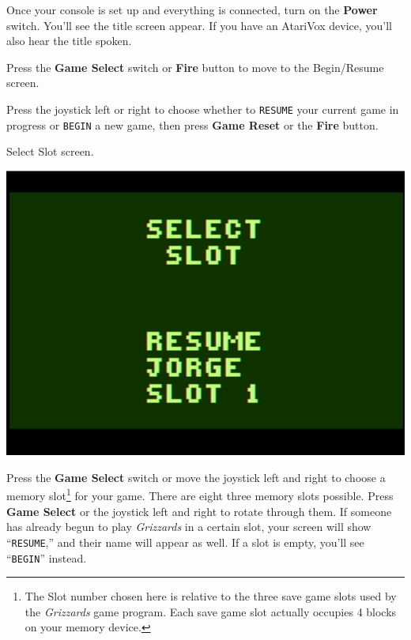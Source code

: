 \documentclass[10pt,twocolumn,openany,article]{memoir}
\begin{document}
Once your  console is set  up and everything  is connected, turn  on the
\textbf{Power} switch. You'll  see the title screen appear.  If you have
an AtariVox device, you'll also hear the title spoken.

Press the \textbf{Game Select} switch or \textbf{Fire} button to move to
the
\ifdefined\NOSAVE
Begin/Resume screen.

Press the  joystick left or  right to choose whether  to \texttt{RESUME}
your current game  in progress or \texttt{BEGIN} a new  game, then press
\textbf{Game Reset} or the \textbf{Fire} button.

\else
Select Slot screen.

\begin{center}
  \includegraphics[width=\columnwidth]{../Manual/SelectSlotNTSC.png}
\end{center}

Press  the \textbf{Game  Select} switch  or move  the joystick  left and
right to  choose a  memory slot\ifdefined\ATARIAGESAVE\else\footnote{The
  Slot number chosen here is relative  to the three save game slots used
  by the \textit{Grizzards}  game program. Each save  game slot actually
  occupies  4  blocks  on  your  memory  device.}\fi{}  for  your  game.
There  are \ifdefined\ATARIAGESAVE  eight \else  three \fi  memory slots
possible. Press \textbf{Game  Select} or the joystick left  and right to
rotate   through  them.   If   someone  has   already   begun  to   play
\textit{Grizzards}   in  a   certain   slot,  your   screen  will   show
``\texttt{RESUME},'' and  their name will appear  as well. If a  slot is
empty, you'll see ``\texttt{BEGIN}'' instead.
\end{document}
